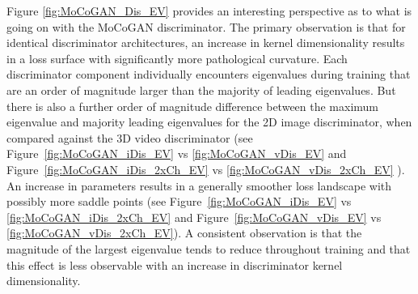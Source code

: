 \documentclass[a4paper,fleqn]{cas-sc}
\begin{document}
Figure \ref{fig:MoCoGAN_Dis_EV} provides an interesting perspective as to what is going on with the MoCoGAN discriminator. The primary observation is that for identical discriminator architectures, an increase in kernel dimensionality results in a loss surface with significantly more pathological curvature. Each discriminator component individually encounters eigenvalues during training that are an order of magnitude larger than the majority of leading eigenvalues. But there is also a further order of magnitude difference between the maximum eigenvalue and majority leading eigenvalues for the 2D image discriminator, when compared against the 3D video discriminator (see Figure~\ref{fig:MoCoGAN_iDis_EV} vs \ref{fig:MoCoGAN_vDis_EV} and Figure~\ref{fig:MoCoGAN_iDis_2xCh_EV} vs \ref{fig:MoCoGAN_vDis_2xCh_EV} ). An increase in parameters results in a generally smoother loss landscape with possibly more saddle points (see Figure~\ref{fig:MoCoGAN_iDis_EV} vs \ref{fig:MoCoGAN_iDis_2xCh_EV} and Figure~\ref{fig:MoCoGAN_vDis_EV} vs \ref{fig:MoCoGAN_vDis_2xCh_EV}). A consistent observation is that the magnitude of the largest eigenvalue tends to reduce throughout training and that this effect is less observable with an increase in discriminator kernel dimensionality.
\end{document}
